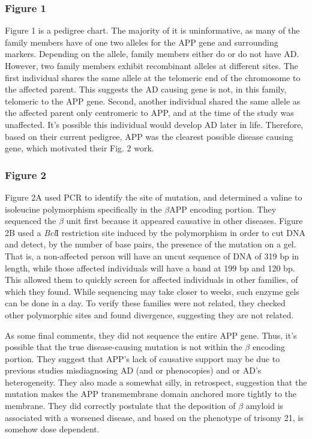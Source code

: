 \documentclass[12pt]{report}
\begin{document}
\subsubsection*{Figure 1} Figure 1 is a pedigree chart. The majority of it is uninformative, as many of the family members have of one two alleles for the APP gene and surrounding markers. Depending on the allele, family members either do or do not have AD. However, two family members exhibit recombinant alleles at different sites. The first individual shares the same allele at the telomeric end of the chromosome to the affected parent. This suggests the AD causing gene is not, in this family, telomeric to the APP gene. Second, another individual shared the same allele as the affected parent only centromeric to APP, and at the time of the study was unaffected. It's possible this individual would develop AD later in life. Therefore, based on their current pedigree, APP was the clearest possible disease causing gene, which motivated their Fig. 2 work. 

\subsubsection*{Figure 2} Figure 2A used PCR to identify the site of mutation, and determined a valine to isoleucine polymorphism specifically in the $\beta$APP encoding portion. They sequenced the $\beta$ unit first because it appeared causative in other diseases. Figure 2B used a \textit{Bcl}I restriction site induced by the polymorphism in order to cut DNA and detect, by the number of base pairs, the presence of the mutation on a gel. That is, a non-affected person will have an uncut sequence of DNA of 319 bp in length, while those affected individuals will have a band at 199 bp and 120 bp. This allowed them to quickly screen for affected individuals in other families, of which they found. While sequencing may take closer to weeks, such enzyme gels can be done in a day. To verify these families were not related, they checked other polymorphic sites and found divergence, suggesting they are not related.\newline

As some final comments, they did not sequence the entire APP gene. Thus, it's possible that the true disease-causing mutation is not within the $\beta$ encoding portion. They suggest that APP's lack of causative support may be due to previous studies misdiagnosing AD (and or phenocopies) and or AD's heterogeneity. They also made a somewhat silly, in retrospect, suggestion that the mutation makes the APP transmembrane domain anchored more tightly to the membrane. They did correctly postulate that the deposition of $\beta$ amyloid is associated with a worsened disease, and based on the phenotype of trisomy 21, is somehow dose dependent. 
\end{document}
